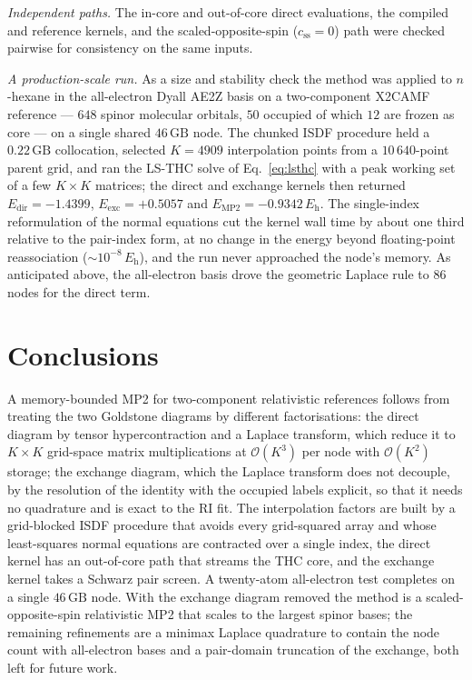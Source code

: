 \documentclass[aip,jcp,amsmath,amssymb,preprint,superscriptaddress]{revtex4-2}%
\newcommand{\Edir}{E_{\mathrm{dir}}}
\newcommand{\Eexc}{E_{\mathrm{exc}}}
\newcommand{\Emp}{E_{\mathrm{MP2}}}
\newcommand{\Ord}[1]{\mathcal{O}\!\left(#1\right)}
\begin{document}
\emph{Independent paths.} The in-core and out-of-core direct evaluations,
the compiled and reference kernels, and the scaled-opposite-spin
($c_{\mathrm{ss}}=0$) path were checked pairwise for consistency on the
same inputs.

\emph{A production-scale run.} As a size and stability check the method was
applied to $n$-hexane in the all-electron Dyall AE2Z basis on a
two-component X2CAMF reference --- $648$ spinor molecular orbitals, $50$
occupied of which $12$ are frozen as core --- on a single shared
$46\,\mathrm{GB}$ node. The chunked ISDF procedure held a
$0.22\,\mathrm{GB}$ collocation, selected $K=4909$ interpolation points
from a $10\,640$-point parent grid, and ran the LS-THC solve of
Eq.~\eqref{eq:lsthc} with a peak working set of a few $K\times K$ matrices;
the direct and exchange kernels then returned
$\Edir=-1.4399$, $\Eexc=+0.5057$ and $\Emp=-0.9342\,E_{\mathrm h}$. The
single-index reformulation of the normal equations cut the kernel wall time
by about one third relative to the pair-index form, at no change in the
energy beyond floating-point reassociation ($\sim 10^{-8}\,E_{\mathrm h}$),
and the run never approached the node's memory. As anticipated above, the
all-electron basis drove the geometric Laplace rule to $86$ nodes for the
direct term.

\section{Conclusions}

A memory-bounded MP2 for two-component relativistic references follows from
treating the two Goldstone diagrams by different factorisations: the direct
diagram by tensor hypercontraction and a Laplace transform, which reduce it
to $K\times K$ grid-space matrix multiplications at $\Ord{K^3}$ per node
with $\Ord{K^2}$ storage; the exchange diagram, which the Laplace transform
does not decouple, by the resolution of the identity with the occupied
labels explicit, so that it needs no quadrature and is exact to the RI fit.
The interpolation factors are built by a grid-blocked ISDF procedure that
avoids every grid-squared array and whose least-squares normal equations
are contracted over a single index, the direct kernel has an out-of-core
path that streams the THC core, and the exchange kernel takes a Schwarz
pair screen. A twenty-atom all-electron test completes on a single
$46\,\mathrm{GB}$ node. With the exchange diagram removed the method is a
scaled-opposite-spin relativistic MP2 that scales to the largest spinor
bases; the remaining refinements are a minimax Laplace quadrature to
contain the node count with all-electron bases and a pair-domain
truncation of the exchange, both left for future work.
\end{document}
